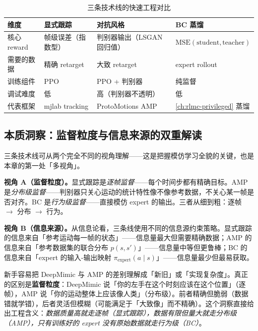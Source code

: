 \begin{table}[ht]
\centering
\small
\caption{三条技术线的快速工程对比}
\label{tab:rlmc-imit-three}
\begin{tabular}{@{}llll@{}}
\toprule
维度 & 显式跟踪 & 对抗风格 & BC 蒸馏 \\
\midrule
核心 reward & 帧级误差（指数型） & 判别器输出（LSGAN 回归值） & $\mathrm{MSE}(\text{student},\text{teacher})$ \\
需要的数据 & 精确 retarget & 大致 retarget & expert rollout \\
训练组件 & PPO & PPO + 判别器 & 纯监督 \\
调试难度 & 低 & 高（判别器不透明） & 低 \\
代表框架 & mjlab tracking & ProtoMotions AMP & \cref{ch:rlmc-privileged} 蒸馏 \\
\bottomrule
\end{tabular}
\end{table}

\subsection{本质洞察：监督粒度与信息来源的双重解读}
\label{sec:rlmc-imit-lines-dual}

三条技术线可从两个完全不同的视角理解——这是把握模仿学习全貌的关键，也是本章的第一处「多视角」。

\textbf{视角 A（监督粒度）。}显式跟踪是\emph{逐帧监督}——每个时间步都有精确目标。AMP 是\emph{分布级监督}——判别器只关心运动的统计特性像不像参考数据，不关心某一帧是否对齐。BC 是\emph{行为级监督}——直接模仿 expert 的输出。三者从细到粗：逐帧 $\to$ 分布 $\to$ 行为。

\textbf{视角 B（信息来源）。}从信息论看，三条线使用不同的信息源约束策略。显式跟踪的信息来自「参考运动每一帧的状态」——信息量最大但需要精确数据；AMP 的信息来自「参考数据集的联合分布 $p(s,s')$」——信息量中等但更鲁棒；BC 的信息来自「expert 的输入-输出映射 $\pi_{\text{expert}}(a\mid s)$」——信息量最少但最易获取。

\begin{insight}\label{ins:rlmc-imit-granularity}
新手容易把 DeepMimic 与 AMP 的差别理解成「新旧」或「实现复杂度」。真正的区别是\textbf{监督粒度}：DeepMimic 说「你的左手在这个时刻应该在这个位置」（逐帧），AMP 说「你的运动整体上应该像人类」（分布级）。前者精确但脆弱（数据错就学错），后者灵活但模糊（可能满足于「大致像」而不精确）。这个洞察直接给出工程含义：\emph{数据质量高就走逐帧（显式跟踪），数据有限但量大就走分布级（AMP），只有训练好的 expert 没有原始数据就走行为级（BC）}。
\end{insight}


